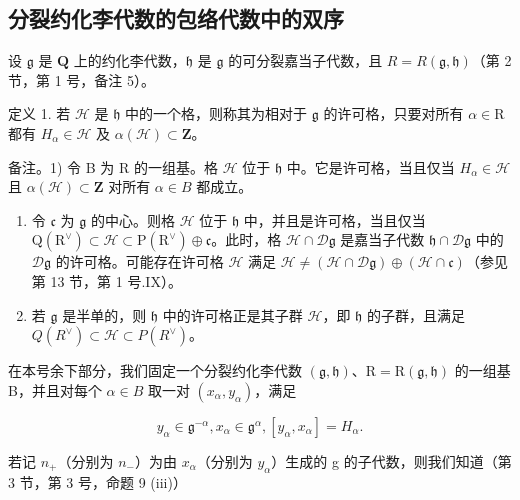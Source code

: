 \subsection{分裂约化李代数的包络代数中的双序}

设 \(\mathfrak{g}\) 是 \(\mathbf{Q}\) 上的约化李代数，\(\mathfrak{h}\) 是 \(\mathfrak{g}\) 的可分裂嘉当子代数，且 \(R = R(\mathfrak{g},\mathfrak{h})\)（第 2 节，第 1 号，备注 5）。

定义 1. 若 \(\mathcal{H}\) 是 \(\mathfrak{h}\) 中的一个格，则称其为相对于 \(\mathfrak{g}\) 的许可格，只要对所有 \(\alpha \in \mathrm{R}\) 都有 \(H_{\alpha} \in \mathcal{H}\) 及 \(\alpha(\mathcal{H}) \subset \mathbf{Z}\)。

备注。1) 令 B 为 R 的一组基。格 \(\mathcal{H}\) 位于 \(\mathfrak{h}\) 中。它是许可格，当且仅当 \(H_{\alpha} \in \mathcal{H}\) 且 \(\alpha(\mathcal{H}) \subset \mathbf{Z}\) 对所有 \(\alpha \in B\) 都成立。

\begin{enumerate}
\def\labelenumi{\arabic{enumi})}
\setcounter{enumi}{1}
\item
  令 \(\mathfrak{c}\) 为 \(\mathfrak{g}\) 的中心。则格 \(\mathcal{H}\) 位于 \(\mathfrak{h}\) 中，并且是许可格，当且仅当 \(\mathrm{Q}(\mathrm{R}^{\vee}) \subset \mathcal{H} \subset \mathrm{P}(\mathrm{R}^{\vee}) \oplus \mathfrak{c}\)。此时，格 \(\mathcal{H} \cap \mathcal{D}\mathfrak{g}\) 是嘉当子代数 \(\mathfrak{h} \cap \mathcal{D}\mathfrak{g}\) 中的 \(\mathcal{D}\mathfrak{g}\) 的许可格。可能存在许可格 \(\mathcal{H}\) 满足 \(\mathcal{H} \neq (\mathcal{H} \cap \mathcal{D}\mathfrak{g}) \oplus (\mathcal{H} \cap \mathfrak{c})\)（参见第 13 节，第 1 号.IX）。
\item
  若 \(\mathfrak{g}\) 是半单的，则 \(\mathfrak{h}\) 中的许可格正是其子群 \(\mathcal{H}\)，即 \(\mathfrak{h}\) 的子群，且满足 \(Q(R^{\vee})\subset \mathcal{H}\subset P(R^{\vee})\)。
\end{enumerate}

在本号余下部分，我们固定一个分裂约化李代数 \((\mathfrak{g},\mathfrak{h})\)、\(\mathrm{R}=\mathrm{R}(\mathfrak{g},\mathfrak{h})\) 的一组基 B，并且对每个 \(\alpha\in B\) 取一对 \((x_{\alpha},y_{\alpha})\)，满足

\[
y _ {\alpha} \in \mathfrak {g} ^ {- \alpha}, x _ {\alpha} \in \mathfrak {g} ^ {\alpha}, [ y _ {\alpha}, x _ {\alpha} ] = H _ {\alpha}.\tag{20}
\]

若记 \(n_{+}\)（分别为 \(n_{-}\)）为由 \(x_{\alpha}\)（分别为 \(y_{\alpha}\)）生成的 g 的子代数，则我们知道（第 3 节，第 3 号，命题 9 (iii)）

